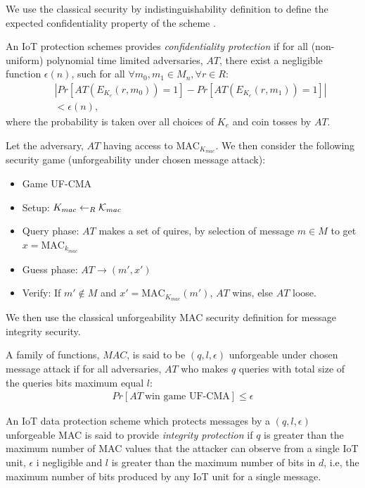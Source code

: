 {We use the classical security by indistinguishability definition to define the expected confidentiality property of the scheme \cite{Golrdreich97}.
\begin{definition}
\label{confidentiality}
An IoT protection schemes provides \emph{confidentiality protection} if for all (non-uniform) polynomial time limited  adversaries, $AT$, there exist a negligible function $\epsilon(n)$, such for all $\forall m_0,m_1 \in M_n, \forall r \in R$: 
\begin{eqnarray}
     &&|Pr[AT(E_{K_e}(r,m_0)) = 1] - Pr[AT(E_{K_e}(r,m_1)) = 1]| \nonumber \\ 
     &&< \epsilon(n), \label{req:eqconfidentiality}
     \label{eq:confidentiality}
\end{eqnarray}
where the probability is taken over all choices of $K_e$ and coin tosses by $AT$.
\end{definition}
Let the adversary, $AT$ having access to $\text{MAC}_{K_{mac}}$. We then consider the following security game (unforgeability under chosen message attack):
\begin{itemize}
    \item[] Game UF-CMA \\
    \item Setup: $K_{mac} \leftarrow_R {\cal{K}}_{mac}$
    \item Query phase: $AT$ makes a set of quires, by selection of message $m \in M$ to get $x = \text{MAC}_{k_{mac}}$
    \item Guess phase: $AT \rightarrow (m',x')$
    \item Verify: If $m' \notin M$ and $x' = \text{MAC}_{K_{mac}}(m')$, $AT$ wins, else $AT$ loose.
\end{itemize}
We then use the classical unforgeability MAC security definition for message integrity security.
\begin{definition}
\label{Macunforgeable}
A family of functions, $MAC$, is said to be $(q,l,\epsilon)$ unforgeable  under  chosen  message attack if for all adversaries, $AT$ who makes $q$ queries with total size of the queries bits maximum equal $l$: 
\begin{eqnarray}
     Pr[AT\: \text{win  game UF-CMA}] \leq \epsilon \label{req:integrity}
\end{eqnarray}
\end{definition}
\begin{definition}
\label{integrity}
An IoT data protection scheme which protects messages by a $(q,l,\epsilon)$ unforgeable MAC is said to provide \textit{integrity protection} if $q$ is greater than the maximum number of MAC values that the attacker can observe from a single IoT unit, $\epsilon$ i negligible and $l$ is greater than the maximum number of bits in $d$, i.e, the maximum number of bits produced by any IoT unit for a single message.

\end{definition}}
